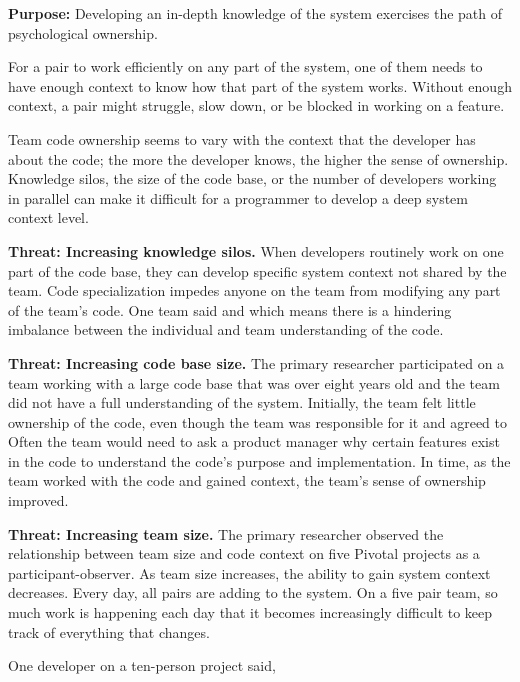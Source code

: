 \textbf{Purpose:} Developing an in-depth knowledge of the system exercises the  path of psychological ownership.

For a pair to work efficiently on any part of the system, one of them needs to have enough context to know how that part of the system works. Without enough context, a pair might struggle, slow down, or be blocked in working on a feature.

Team code ownership seems to vary with the context that the developer has about the code; the more the developer knows, the higher the sense of ownership. Knowledge silos, the size of the code base, or the number of developers working in parallel can make it difficult for a programmer to develop a deep system context level.

\textbf{Threat: Increasing knowledge silos.} When developers routinely work on one part of the code base, they can develop specific system context not shared by the team. Code specialization impedes anyone on the team from modifying any part of the team’s code.  One team said  and  which means there is a hindering imbalance between the individual and team understanding of the code.

\textbf{Threat: Increasing code base size.} The primary researcher participated on a team working with a large code base that was over eight years old and the team did not have a full understanding of the system. Initially, the team felt little ownership of the code, even though the team was responsible for it and agreed to  Often the team would need to ask a product manager why certain features exist in the code to understand the code’s purpose and implementation. In time, as the team worked with the code and gained context, the team’s sense of ownership improved.

\textbf{Threat: Increasing team size.} The primary researcher observed the relationship between team size and code context on five Pivotal projects as a participant-observer. As team size increases, the ability to gain system context decreases. Every day, all pairs are adding to the system. On a five pair team, so much work is happening each day that it becomes increasingly difficult to keep track of everything that changes.

One developer on a ten-person project said, 

